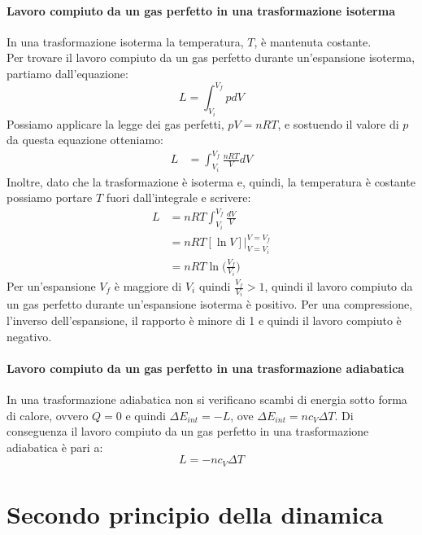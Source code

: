 \documentclass[12pt]{report}
\begin{document}
	\paragraph{Lavoro compiuto da un gas perfetto in una trasformazione isoterma}
	In una trasformazione isoterma la temperatura, $T$, è mantenuta costante. \\
	Per trovare il lavoro compiuto da un gas perfetto durante un'espansione isoterma, partiamo dall'equazione:
	\[
	L = \int_{V_i}^{V_f}pd V
	\]
	Possiamo applicare la legge dei gas perfetti, $pV = nRT$, e sostuendo il valore di $p$ da questa equazione otteniamo:
	\begin{align*}
	L &= \int_{V_i}^{V_f}\frac{nRT}{V}d V
	\end{align*}
	Inoltre, dato che la trasformazione è isoterma e, quindi, la temperatura è costante possiamo portare $T$ fuori dall'integrale e scrivere:
	\begin{align*}
		L &= nRT\int_{V_i}^{V_f}\frac{dV}{V} \\
		&= nRT[\ln V] \bigg|^{V = V_f}_{V = V_i}\\
		&= nRT\ln\Big(\frac{V_f}{V_i}\Big)
	\end{align*}
	Per un'espansione $V_f$ è maggiore di $V_i$ quindi $\frac{V_f}{V_i} > 1$, quindi il lavoro compiuto da un gas perfetto durante un'espansione isoterma è positivo. Per una compressione, l'inverso dell'espansione, il rapporto è minore di 1 e quindi il lavoro compiuto è negativo.
	\paragraph{Lavoro compiuto da un gas perfetto in una trasformazione adiabatica}
	In una trasformazione adiabatica non si verificano scambi di energia sotto forma di calore, ovvero $Q = 0$ e quindi $\Delta E_{int} = -L$, ove $\Delta E_{int} = nc_V\Delta T$. Di conseguenza il lavoro compiuto da un gas perfetto in una trasformazione adiabatica è pari a:
	\[
	L = -nc_V\Delta T
	\]
	\section{Secondo principio della dinamica}
\end{document}
